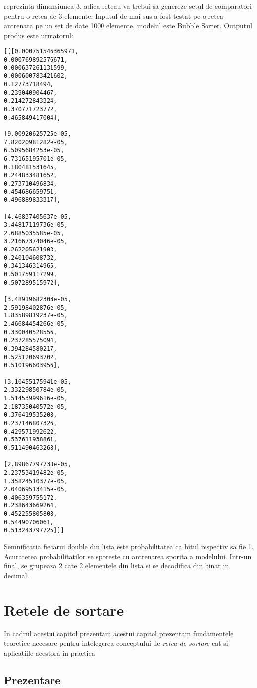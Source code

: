 \documentclass[12pt]{article}
\begin{document}
reprezinta dimensiunea 3, adica reteau va trebui sa genereze setul de comparatori pentru o retea de 3 elemente. Inputul de mai sus a fost testat pe o retea antrenata pe un set de date 1000 elemente, modelul este Bubble Sorter. Outputul produs este urmatorul:
\begin{center}
\begin{multicols}{2}
\begin{lstlisting}
[[[0.000751546365971,
0.000769892576671,
0.000637261131599,
0.000600783421602,
0.12773718494,
0.239040904467,
0.214272843324,
0.370771723772,
0.465849417004],

[9.00920625725e-05,
7.82020981282e-05,
6.5095684253e-05,
6.73165195701e-05,
0.180481531645,
0.244833481652,
0.273710496834,
0.454686659751,
0.496889833317],

[4.46837405637e-05,
3.44817119736e-05,
2.6885035585e-05,
3.21667374046e-05,
0.262205621903,
0.240104608732,
0.341346314965,
0.501759117299,
0.507289515972],

[3.48919682303e-05,
2.59198402876e-05,
1.83589819237e-05,
2.46684454266e-05,
0.330040528556,
0.237285575094,
0.394284580217,
0.525120693702,
0.510196603956],

[3.10455175941e-05,
2.33229850784e-05,
1.51453999616e-05,
2.18735040572e-05,
0.376419535208,
0.237146807326,
0.429571992622,
0.537611938861,
0.511490463268],

[2.89867797738e-05,
2.23753419482e-05,
1.35824510377e-05,
2.04069513415e-05,
0.406359755172,
0.238643669264,
0.452255805808,
0.54490706061,
0.513243797725]]]
\end{lstlisting}
\end{multicols}
\end{center}

Semnificatia fiecarui double din lista este probabilitatea ca bitul respectiv sa fie 1. Acuratetea probabilitatilor se sporeste cu antrenarea sporita a modelului. Intr-un final, se grupeaza 2 cate 2 elementele din lista si se decodifica din binar in decimal.



\section{Retele de sortare}

In cadrul acestui capitol prezentam acestui capitol prezentam fundamentele teoretice necesare pentru intelegerea conceptului de \textit{retea de sortare} cat si aplicatiile acestora in practica

\subsection{Prezentare}
\end{document}
